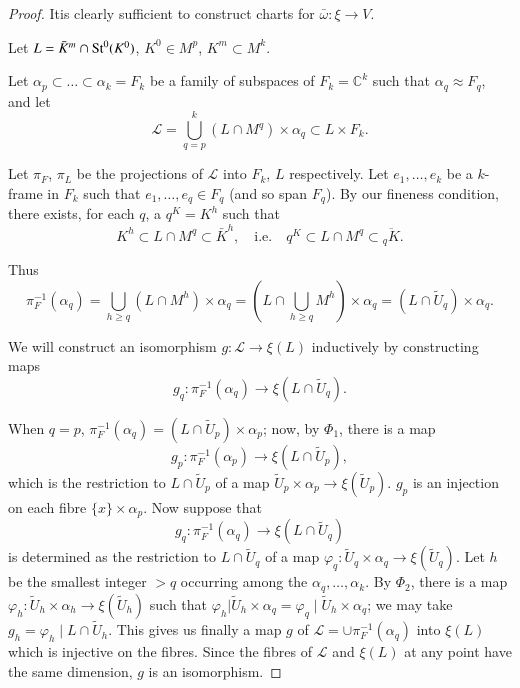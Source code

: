 \begin{proof} %
It\pageoriginale is clearly sufficient to construct charts for
$\bar{\omega}:\xi\to V$. 

Let $L=\bar{K}^{m}\cap \operatorname{St}^{0}(K^{0})$, $K^{0}\in M^{p}$,
$K^{m}\subset M^{k}$.

Let $\alpha_{p}\subset\ldots\subset \alpha_{k}=F_{k}$ be a family of
subspaces of $F_{k}=\mathbb{C}^{k}$ such that $\alpha_{q}\approx
F_{q}$, and let
$$
\mathscr{L}=\bigcup^{k}_{q=p}(L\cap M^{q})\times\alpha_{q}\subset
L\times F_{k}. 
$$

Let $\pi_{F}$, $\pi_{L}$ be the projections of $\mathscr{L}$ into
$F_{k}$, $L$ respectively. Let $e_{1},\ldots,e_{k}$ be a $k$-frame in
$F_{k}$ such that $e_{1},\ldots,e_{q}\in F_{q}$ (and so span
$F_{q}$). By our fineness condition, there exists, for each $q$, a
$q^{K}=K^{h}$ such that
$$
K^{h}\subset L\cap M^{q}\subset \bar{K}^{h},\quad\text{i.e.}\quad
q^{K}\subset L\cap M^{q}\subset \overline{{}_{q}K}.
$$

Thus
$$
\pi^{-1}_{F}(\alpha_{q})=\bigcup_{h\geq q}(L\cap
M^{h})\times\alpha_{q}=(L\cap \bigcup_{h\geq
  q}M^{h})\times\alpha_{q}=(L\cap \widetilde{U}_{q})\times \alpha_{q}.
$$

We will construct an isomorphism $g:\mathscr{L}\to \xi(L)$ inductively
by constructing maps
$$
g_{q}:\pi^{-1}_{F}(\alpha_{q})\to \xi(L\cap \widetilde{U}_{q}).
$$

When $q=p$, $\pi^{-1}_{F}(\alpha_{q})=(L\cap \widetilde{U}_{p})\times
\alpha_{p}$; now, by $\Phi_{1}$, there is a map
$$
g_{p}:\pi^{-1}_{F}(\alpha_{p})\to \xi(L\cap \widetilde{U}_{p}),
$$
which is the restriction to $L\cap \widetilde{U}_{p}$ of a map
$\widetilde{U}_{p}\times \alpha_{p}\to \xi(\widetilde{U}_{p})$. 
$g_{p}$ is an injection on each fibre $\{x\}\times \alpha_{p}$. Now
suppose that
$$
g_{q}:\pi^{-1}_{F}(\alpha_{q})\to \xi(L\cap \widetilde{U}_{q})
$$\pageoriginale
is determined as the restriction to $L\cap \widetilde{U}_{q}$ of a map
$\varphi_{q}:\widetilde{U}_{q}\times \alpha_{q}\to
\xi(\widetilde{U}_{q})$. Let $h$ be the smallest integer $>q$
occurring among the $\alpha_{q},\ldots,\alpha_{k}$. By $\Phi_{2}$,
there is a map $\varphi_{h}:\widetilde{U}_{h}\times \alpha_{h}\to
\xi(\widetilde{U}_{h})$ such that
$\varphi_{h}|\widetilde{U}_{h}\times\alpha_{q}=\varphi_{q}\mid\widetilde{U}_{h}\times\alpha_{q}$;
we may take $g_{h}=\varphi_{h}\mid L\cap \widetilde{U}_{h}$. This
gives us finally a map $g$ of $\mathscr{L}=\cup
\pi^{-1}_{F}(\alpha_{q})$ into $\xi(L)$ which is injective on the
fibres. Since the fibres of $\mathscr{L}$ and $\xi(L)$ at any point
have the same dimension, $g$ is an isomorphism.
\end{proof}

